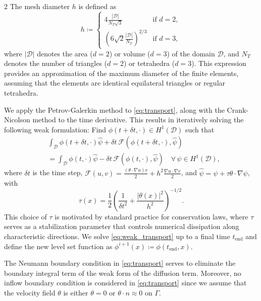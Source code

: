 \documentclass[a4paper, oneside]{article}
\begin{document}
\begin{multicols}{2}
The mesh diameter $h$ is defined as
\begin{equation}
	h \coloneqq
	\begin{cases}
		4\frac{\left|\mathcal{D}\right|}{N_T\sqrt{3}} & \text{if } d = 2,\\
		\left(6\sqrt{2}\frac{\left|\mathcal{D}\right|}{N_T}\right)^{2/3} & \text{if } d = 3,	
	\end{cases}
\end{equation}
where $\left|\mathcal{D}\right|$ denotes the area ($d=2$) or volume ($d=3$)
of the domain $\mathcal{D}$, and $N_T$ denotes the number of triangles ($d=2$) 
or tetrahedra ($d=3$).
This expression provides an approximation of the maximum diameter of the finite elements,
assuming that the elements are identical equilateral triangles or regular tetrahedra.

We apply the Petrov-Galerkin method \cite{MR1640142} to \eqref{eq:transport},
along with the Crank-Nicolson method to the time derivative.
This results in iteratively solving the following weak formulation:
Find $\phi(t+\delta t,\cdot) \in H^1(\mathcal{D})$ such that
\begin{align} \label{eq:weak_transport}
	& \int_{\mathcal{D}} \phi(t+\delta t,\cdot)\hat{\psi} + \delta t \, \mathcal{F}(\phi(t+\delta t,\cdot), \hat{\psi})  \nonumber \\
	& = \int_{\mathcal{D}} \phi(t,\cdot) \hat{\psi} - \delta t \, \mathcal{F}(\phi(t,\cdot), \hat{\psi})
	\quad \forall \, \psi\in H^1(\mathcal{D}),
\end{align}
where $\delta t$ is the time step,
$\mathcal{F}(u, v) = \frac{(\theta \cdot \nabla u) v}{2} + h^2\frac{\nabla u \cdot \nabla v}{2}$,
and $\hat{\psi}=\psi+\tau \theta\cdot\nabla\psi$, with 
\begin{equation} \label{eq:tau_lv}
	\tau(x) = \frac{1}{2}\left(\frac{1}{\delta t^2}  + \frac{|\theta(x)|^2}{h^2}\right)^{-1/2}.
\end{equation}
This choice of $\tau$ is motivated by standard practice for conservation laws,
where $\tau$ serves as a stabilization parameter that controls numerical dissipation along characteristic directions.
We solve \eqref{eq:weak_transport} up to a final time $t_{\text{end}}$ and
define the new level set function as $\phi^{i+1}(x) \coloneqq \phi(t_{\text{end}},x)$.

The Neumann boundary condition in \eqref{eq:transport} serves to eliminate
the boundary integral term of the weak form of the diffusion term.
Moreover, no inflow boundary condition is considered in \eqref{eq:transport}
since we assume that the velocity field $\theta$ is either $\theta = 0$ 
or $\theta \cdot n \approx 0$ on $\Gamma$.


\end{multicols}
\end{document}
